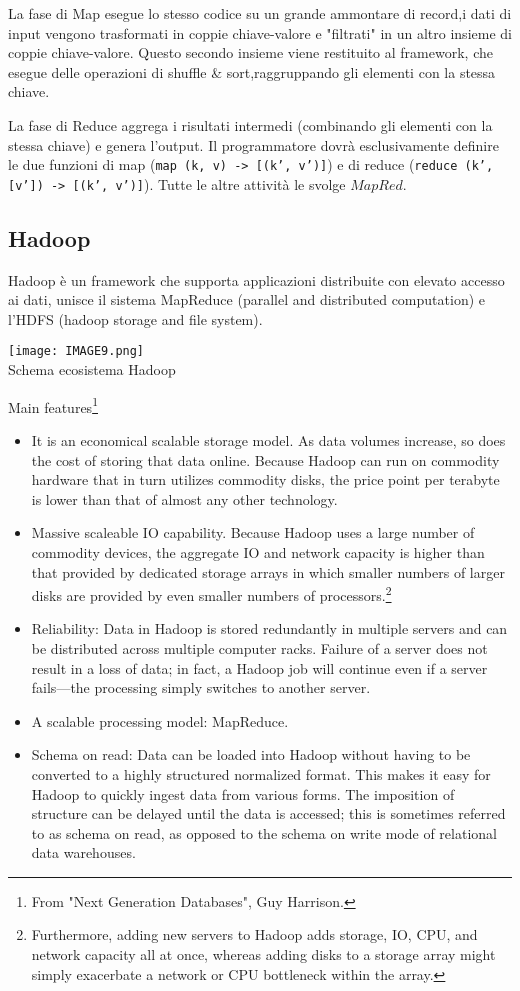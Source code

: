 \documentclass[a4page, 11pt]{article}
\begin{document}
La fase di Map esegue lo stesso codice su un grande ammontare di record,i dati di input vengono trasformati in coppie chiave-valore e "filtrati" in un altro insieme di coppie chiave-valore. Questo secondo insieme viene restituito al framework, che esegue delle operazioni di shuffle \& sort,raggruppando gli elementi con la stessa chiave. 

La fase di Reduce aggrega i risultati intermedi (combinando gli elementi con la stessa chiave) e genera l’output. Il programmatore dovrà esclusivamente definire le due funzioni di map (\texttt{map (k, v) -> [(k’, v’)]}) e di reduce (\texttt{reduce (k’, [v’]) -> [(k’, v’)]}). Tutte le altre attività le svolge  $MapRed$.
\subsection{Hadoop}
Hadoop è un framework che supporta applicazioni distribuite con elevato accesso ai dati, unisce il sistema MapReduce (parallel and distributed computation) e l’HDFS (hadoop storage and file system).
\begin{center}
\texttt{[image: IMAGE9.png]}\\
Schema ecosistema Hadoop
\end{center}
Main features\footnote{From "Next Generation
Databases", Guy Harrison.} %
\begin{itemize}

 \item It is an economical scalable storage model. As data volumes increase, so does the cost of storing that data online.
 Because Hadoop can run on commodity hardware that in turn utilizes commodity disks, the price point per terabyte is lower than that of almost any other technology.
\item Massive scaleable IO capability. Because Hadoop uses a large number of
commodity devices, the aggregate IO and network capacity is higher than that
provided by dedicated storage arrays in which smaller numbers of larger disks are provided by even smaller numbers of processors.\footnote{Furthermore, adding new servers to Hadoop adds storage, IO, CPU, and network capacity all at once, whereas adding disks to a storage array might simply exacerbate a network or CPU bottleneck within the array.}
\item Reliability: Data in Hadoop is stored redundantly in multiple servers and can be distributed across multiple computer racks. Failure of a server does not result in a loss of data; in fact, a Hadoop job will continue even if a server fails—the processing simply switches to another server.
\item A scalable processing model: MapReduce.
\item Schema on read: Data can be loaded into Hadoop without having to be converted
to a highly structured normalized format. This makes it easy for Hadoop to quickly ingest data from various forms. The imposition of structure can be delayed until the data is accessed; this is sometimes referred to as schema on read, as opposed to the schema on write mode of relational data warehouses.
\end{itemize}
\end{document}
